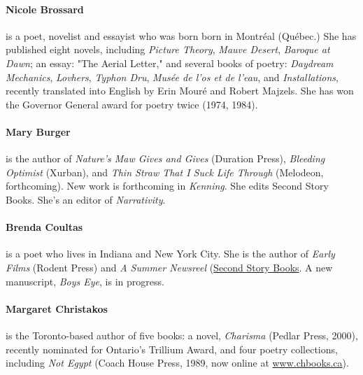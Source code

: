 \documentclass[
]{memoir}
\begin{document}
\hypertarget{nicole-brossard}{%
\paragraph{Nicole Brossard}\label{nicole-brossard}}

is a poet, novelist and essayist who was born born in Montréal (Québec.)
She has published eight novels, including \emph{Picture Theory},
\emph{Mauve Desert}, \emph{Baroque at Dawn}; an essay: "The Aerial
Letter," and several books of poetry: \emph{Daydream Mechanics},
\emph{Lovhers}, \emph{Typhon Dru}, \emph{Musée de l'os et de l'eau}, and
\emph{Installations}, recently translated into English by Erin Mouré and
Robert Majzels. She has won the Governor General award for poetry twice
(1974, 1984).

\hypertarget{mary-burger-1}{%
\paragraph{Mary Burger}\label{mary-burger-1}}

is the author of \emph{Nature's Maw Gives and Gives} (Duration Press),
\emph{Bleeding Optimist} (Xurban), and \emph{Thin Straw That I Suck Life
Through} (Melodeon, forthcoming). New work is forthcoming in
\emph{Kenning}. She edits Second Story Books. She's an editor of
\emph{Narrativity}.

\hypertarget{brenda-coultas}{%
\paragraph{Brenda Coultas}\label{brenda-coultas}}

is a poet who lives in Indiana and New York City. She is the author of
\emph{Early Films} (Rodent Press) and \emph{A Summer Newsreel}
(\href{http://www.2ndstorybooks.com}{Second Story Books}. A new
manuscript, \emph{Boys Eye}, is in progress.

\hypertarget{margaret-christakos}{%
\paragraph{Margaret Christakos}\label{margaret-christakos}}

is the Toronto-based author of five books: a novel, \emph{Charisma}
(Pedlar Press, 2000), recently nominated for Ontario's Trillium Award,
and four poetry collections, including \emph{Not Egypt} (Coach House
Press, 1989, now online at
\href{http://www.chbooks.ca}{www.chbooks.ca}).
\end{document}

